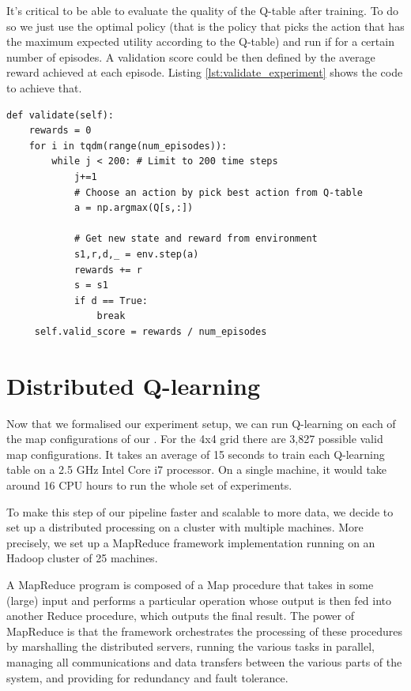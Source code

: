 It's critical to be able to evaluate the quality of the Q-table after training. To do so we just use the optimal policy (that is the policy that picks the action that has the maximum expected utility according to the Q-table) and run if for a certain number of episodes. A validation score could be then defined by the average reward achieved at each episode. Listing \ref{lst:validate_experiment} shows the code to achieve that.

\begin{minipage}{\linewidth}
\lstset{language=Python}
\lstset{frame=lines}
\lstset{basicstyle=\footnotesize}
\begin{lstlisting}
def validate(self):
	rewards = 0
    for i in tqdm(range(num_episodes)):
        while j < 200: # Limit to 200 time steps
            j+=1
            # Choose an action by pick best action from Q-table
            a = np.argmax(Q[s,:])
            
            # Get new state and reward from environment
            s1,r,d,_ = env.step(a)
            rewards += r
            s = s1
            if d == True:
                break
     self.valid_score = rewards / num_episodes
\end{lstlisting}
\end{minipage}


\section{Distributed Q-learning}
Now that we formalised our experiment setup, we can run Q-learning on each of the map configurations of our . For the 4x4 grid there are 3,827 possible valid map configurations. It takes an average of 15 seconds to train each Q-learning table on a 2.5 GHz Intel Core i7 processor. On a single machine, it would take around 16 CPU hours to run the whole set of experiments.

To make this step of our pipeline faster and scalable to more data, we decide to set up a distributed processing on a cluster with multiple machines. More precisely, we set up a MapReduce framework \parencite{Dean:2004:MSD:1251254.1251264} implementation running on an Hadoop cluster \parencite{shvachko2010hadoop} of 25 machines.

A MapReduce program is composed of a Map procedure that takes in some (large) input and performs a particular operation whose output is then fed into another Reduce procedure, which outputs the final result. The power of MapReduce is that the framework orchestrates the processing of these procedures by marshalling the distributed servers, running the various tasks in parallel, managing all communications and data transfers between the various parts of the system, and providing for redundancy and fault tolerance.

